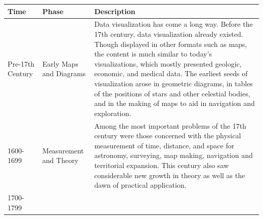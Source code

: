 \documentclass[]{book}
\begin{document}
\begin{longtable}[]{@{}lll@{}}
\toprule
\begin{minipage}[b]{0.12\columnwidth}\raggedright\strut
\textbf{Time}\strut
\end{minipage} & \begin{minipage}[b]{0.11\columnwidth}\raggedright\strut
\textbf{Phase}\strut
\end{minipage} & \begin{minipage}[b]{0.68\columnwidth}\raggedright\strut
\textbf{Description}\strut
\end{minipage}\tabularnewline
\midrule
\endhead
\begin{minipage}[t]{0.12\columnwidth}\raggedright\strut
Pre-17th Century\strut
\end{minipage} & \begin{minipage}[t]{0.11\columnwidth}\raggedright\strut
Early Maps and Diagrams\strut
\end{minipage} & \begin{minipage}[t]{0.68\columnwidth}\raggedright\strut
Data visualization has come a long way. Before the 17th century, data
visualization already existed. Though displayed in other formats such as
maps, the content is much similar to today's visualizations, which
mostly presented geologic, economic, and medical data. The earliest
seeds of visualization arose in geometric diagrams, in tables of the
positions of stars and other celestial bodies, and in the making of maps
to aid in navigation and exploration.\strut
\end{minipage}\tabularnewline
\begin{minipage}[t]{0.12\columnwidth}\raggedright\strut
1600-1699\strut
\end{minipage} & \begin{minipage}[t]{0.11\columnwidth}\raggedright\strut
Measurement and Theory\strut
\end{minipage} & \begin{minipage}[t]{0.68\columnwidth}\raggedright\strut
Among the most important problems of the 17th century were those
concerned with the physical measurement of time, distance, and space for
astronomy, surveying, map making, navigation and territorial expansion.
This century also saw considerable new growth in theory as well as the
dawn of practical application.\strut
\end{minipage}\tabularnewline
\begin{minipage}[t]{0.12\columnwidth}\raggedright\strut
1700-1799\strut
\end{minipage} & \begin{minipage}[t]{0.11\columnwidth}\raggedright\strut

\end{minipage}
\end{longtable}
\end{document}
